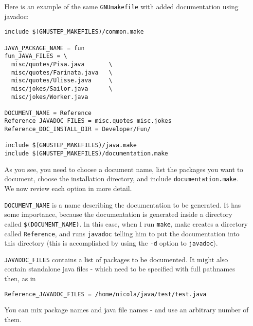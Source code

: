 Here is an example of the same \texttt{GNUmakefile} with added
documentation using javadoc:
\begin{verbatim}
include $(GNUSTEP_MAKEFILES)/common.make

JAVA_PACKAGE_NAME = fun
fun_JAVA_FILES = \
  misc/quotes/Pisa.java       \
  misc/quotes/Farinata.java   \
  misc/quotes/Ulisse.java     \
  misc/jokes/Sailor.java      \
  misc/jokes/Worker.java

DOCUMENT_NAME = Reference
Reference_JAVADOC_FILES = misc.quotes misc.jokes
Reference_DOC_INSTALL_DIR = Developer/Fun/

include $(GNUSTEP_MAKEFILES)/java.make
include $(GNUSTEP_MAKEFILES)/documentation.make
\end{verbatim}%
As you see, you need to choose a document name, list the packages you
want to document, choose the installation directory, and include
\texttt{documentation.make}.  We now review each option in more detail.

\texttt{DOCUMENT\_NAME} is a name describing the documentation to be 
generated.  It has some importance, because the documentation is
generated inside a directory called \texttt{\$(DOCUMENT\_NAME)}.  In
this case, when I run \texttt{make}, make creates a directory called
\texttt{Reference}, and runs \texttt{javadoc} telling him to put 
the documentation into this directory (this is accomplished by using
the \texttt{-d} option to \texttt{javadoc}).

\texttt{JAVADOC\_FILES} contains a list of packages to be documented.  
It might also contain standalone java files - which need to be
specified with full pathnames then, as in 
\begin{verbatim}
Reference_JAVADOC_FILES = /home/nicola/java/test/test.java
\end{verbatim}
You can mix package names and java file names - and use an arbitrary
number of them.

